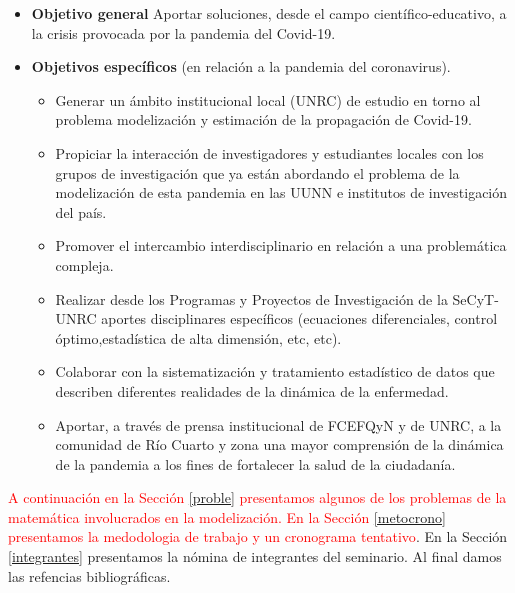 \documentclass{article}
\begin{document}
\begin{itemize}
\item   {\bf Objetivo general} Aportar soluciones, desde el campo científico-educativo, a la crisis provocada por la pandemia del Covid-19.


\item {\bf Objetivos específicos}  (en relación a la pandemia del coronavirus).
\begin{itemize}
	\item Generar un ámbito institucional local (UNRC) de estudio en torno al problema modelización   y estimación de la propagación de Covid-19.
	
	\item Propiciar la interacción de investigadores y estudiantes locales con los grupos de investigación que ya están abordando el problema de la modelización de esta pandemia en las UUNN e institutos de investigación del país. 
	
	\item Promover el intercambio interdisciplinario en relación a una problemática compleja.
	
	\item Realizar desde los Programas y Proyectos de Investigación de la SeCyT-UNRC aportes disciplinares específicos (ecuaciones diferenciales, control óptimo,estadística de alta dimensión, etc, etc). 
	
	\item Colaborar con la sistematización y tratamiento estadístico de datos que describen diferentes realidades de la dinámica de la enfermedad.  
	
	\item Aportar, a través de prensa institucional de FCEFQyN y de UNRC, a la comunidad de Río Cuarto y zona una mayor comprensión de la dinámica de la pandemia a los fines de fortalecer la salud de la ciudadanía.	
	
	
\end{itemize}

\end{itemize}



\noindent \textcolor{red}{A continuación en la Sección \ref{proble}  presentamos algunos de los problemas de la matemática  involucrados en la modelización.  En la Sección \ref{metocrono} presentamos la medodologia de trabajo y un cronograma tentativo}. En la Sección \ref{integrantes} presentamos la nómina de integrantes del seminario. Al final damos las refencias bibliográficas.
\end{document}
